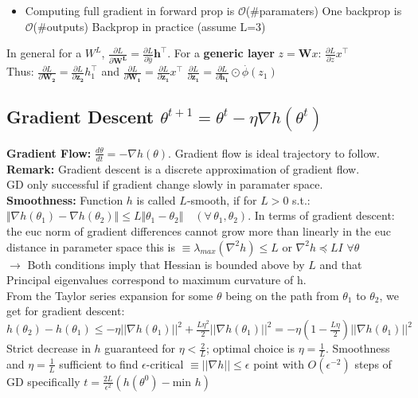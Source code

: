 \begin{itemize}
    \item Computing full gradient in forward prop is \(\mathcal{O}\)(\#paramaters) One backprop is \(\mathcal{O}\)(\#outputs)
Backprop in practice (assume L=3)
\end{itemize}
In general for a $W^L$, \(\frac{\partial  L}{\partial \mathbf{W^L}} = \frac{\partial L}{\partial \hat{y}} \mathbf{h}^\top\). For a \textbf{generic layer} $z=\mathbf{W}x$: \(\frac{\partial L}{\partial z} x^\top\)\\
Thus:  \(\frac{\partial L}{\partial \mathbf{W_2}}=  \frac{\partial L}{\partial \mathbf{z_2}}h_1^\top\) and \(\frac{\partial L}{\partial \mathbf{W_1}}=  \frac{\partial L}{\partial \mathbf{z_1}}x^\top\) \quad \(\frac{\partial L}{\partial \mathbf{z_1}}=  \frac{\partial L}{\partial \mathbf{h_1}} \odot \overset{.}{\phi} (z_1)\)

\subsection{Gradient Descent  \(\theta^{t+1}=\theta^t-\eta\nabla h(\theta^t)\)}
\textbf{Gradient Flow:}
$\frac{d \theta}{dt}=- \nabla h(\theta)$. Gradient flow is ideal trajectory to follow. 
\textbf{Remark:} Gradient descent is a discrete approximation of gradient flow.\\
GD only successful if gradient change slowly in paramater space. \\
\textbf{Smoothness:}
Function $h$ is called $L$-smooth, if for $L>0$ s.t.:
$\Vert \nabla h(\theta_1) - \nabla h(\theta_2) \Vert \leq L \Vert \theta_1 - \theta_2 \Vert \quad (\forall \, \theta_1, \theta_2).$
In terms of gradient descent: the euc norm of gradient differences cannot grow more than linearly in the euc distance in parameter space this is \(\equiv \lambda_{max}(\nabla^2h)\leq L\) or \(\nabla^2h\preceq LI\) \(\forall \theta\)  \\\(\rightarrow\) Both conditions imply that Hessian is bounded above by \(L\) and that Principal eigenvalues correspond to maximum curvature of h. \\
From the Taylor series expansion for some $\theta$ being on the path from $\theta_1$ to $\theta_2$, we get for gradient descent: \\ 
$h(\theta_2) - h(\theta_1) \leq -\eta ||\nabla h(\theta_1)||^2 + \frac{L\eta^2}{2}||\nabla h(\theta_1)||^2 = -\eta\left( 1- \frac{L\eta}{2}\right) || \nabla h(\theta_1)||^2 $\\
\textrightarrow Strict decrease in $h$ guaranteed for $\eta<\frac{2}{L}$; optimal choice is $\eta = \frac{1}{L}$.
\textrightarrow Smoothness and $\eta = \frac{1}{L}$ sufficient to find $\epsilon$-critical \(\equiv ||\nabla h||\leq \epsilon\) point with $O(\epsilon^{-2})$ steps of GD specifically \(t=\frac{2L}{\epsilon^2}(h(\theta^0)-\text{min }h)\)

